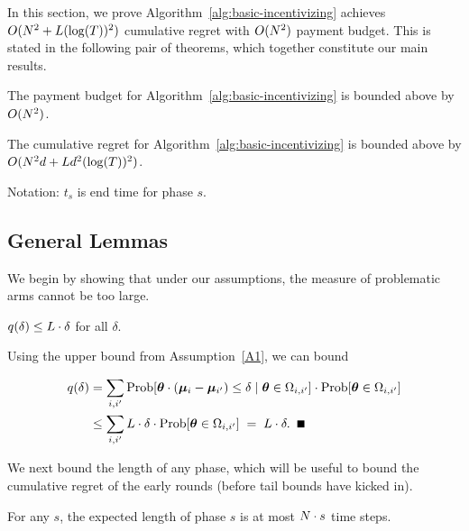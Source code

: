In this section, we prove Algorithm~\ref{alg:basic-incentivizing} achieves $O(N^2+L(\log(T))^2)$ cumulative regret with $O(N^2)$ payment budget.  This is stated in the following pair of theorems, which together constitute our main results.

\begin{theorem}
The payment budget for Algorithm~\ref{alg:basic-incentivizing} is bounded above by $O(N^2)$. 
\label{rst:budget}
\end{theorem}


\begin{theorem}
The cumulative regret for Algorithm~\ref{alg:basic-incentivizing}
is bounded above by $O(N^2 d + L d^2(\log(T))^2)$.
\label{rst:regret}
\end{theorem}


Notation: $t_s$ is end time for phase $s$.

\subsection{General Lemmas}

We begin by showing that under our assumptions, the measure of
problematic arms cannot be too large.

\begin{lemma} \label{lem:sdelta}
$q(\delta) \leq L \cdot \delta$ for all $\delta$.
\end{lemma}

\begin{emptyproof}
Using the upper bound from Assumption~\ref{A1}, we can bound

\begin{align*}
\AlmostTied{\delta}
& = \sum_{i,i'} \ProbC{\AgV \cdot (\ArmV{i} - \ArmV{i'}) \leq \delta}%
    {\AgV \in \FirstTwo{i}{i'}}
  \cdot \Prob{\AgV \in \FirstTwo{i}{i'}}\\
& \leq \sum_{i,i'} \TieDensity \cdot \delta
    \cdot \Prob{\AgV \in \FirstTwo{i}{i'}}
\; = \; \TieDensity \cdot \delta. \QED
\end{align*}
\end{emptyproof}

We next bound the length of any phase, which will be useful to bound
the cumulative regret of the early rounds
(before tail bounds have kicked in).

\begin{lemma} \label{lem:phase-length}
For any $s$, the expected length of phase $s$ is at most
$N \cdot s$ time steps.
\end{lemma}

